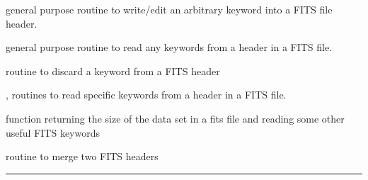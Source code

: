 \begin{related}
  \begin{sulist}{} %
  \item[\htmlref{add\_card}{sub:add_card}] general purpose routine to write/edit an arbitrary
keyword into a FITS file header.
  \item[\htmlref{get\_card}{sub:get_card}] general purpose routine to read any keywords from a header in a FITS file.
  \item[\htmlref{del\_card}{sub:del_card}] routine to discard a keyword from a FITS header
  \item[\htmlref{read\_par}{sub:read_par}, \htmlref{number\_of\_alms}{sub:number_of_alms}] routines to read specific keywords from a
  header in a FITS file.
  \item[\htmlref{getsize\_fits}{sub:getsize_fits}] function returning the size of the data set in a fits
  file and reading some other useful FITS keywords
  \item[\htmlref{merge\_headers}{sub:merge_headers}] routine to merge two FITS headers
  \end{sulist}
\end{related}

\rule{\hsize}{2mm}

\newpage
